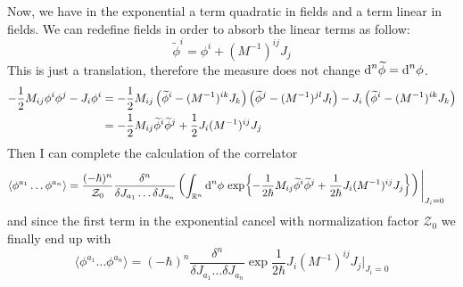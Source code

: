\documentclass[../main/main.tex]{subfiles}
\begin{document}
Now, we have in the exponential a term quadratic in fields and a term linear in fields. We can redefine fields in order to absorb the linear terms as follow:
\[\widetilde\phi^i=\phi^i+(M^{-1})^{ij}J_j\]
This is just a translation, therefore the measure does not change $\textup{d}^n\widetilde\phi=\textup{d}^n\phi$. 
\begin{align*}
-\frac12M_{ij}\phi^i\phi^j-J_i\phi^i
&=-\frac12M_{ij}\left(\widetilde\phi^i-(M^{-1})^{ik}J_k\right)\left(\widetilde\phi^j-(M^{-1})^{jl}J_l\right)-J_i\left(\widetilde\phi^i-(M^{-1})^{ik}J_k\right)\\
&=-\frac12M_{ij}\widetilde\phi^i\widetilde\phi^j+\frac12J_i(M^{-1})^{ij}J_j
\end{align*}
Then I can complete the calculation of the correlator
\begin{align*}
\langle\phi^{a_1}\dots\phi^{a_n}\rangle
&=\frac{(-\hbar)^n}{\mathcal Z_0}\frac{\delta^n}{\delta J_{a_1}\dots \delta J_{a_n}}\left(\int_{\mathbb{R}^n}\textup{d}^n\phi\,\exp{-\frac1{2\hbar}M_{ij}\widetilde\phi^i\widetilde\phi^j+\frac1{2\hbar}J_i(M^{-1})^{ij}J_j}\right)\Bigg\vert_{J_i=0}
\end{align*}
and since the first term in the exponential cancel with normalization factor $\mathcal Z_0$ we finally end up with
\begin{equation}\label{eqn:0-dim-corr-fin}\boxed{
\langle\phi^{a_1}\dots\phi^{a_n}\rangle
=(-\hbar)^n\frac{\delta^n}{\delta J_{a_1}\dots \delta J_{a_n}}\exp{\frac1{2\hbar}J_i(M^{-1})^{ij}J_j}\Bigg\vert_{J_i=0}
}\end{equation}
\end{document}
